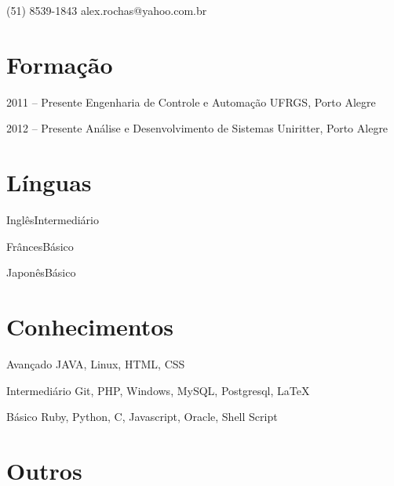 \documentclass{tccv}
\begin{document}
{(51) 8539-1843 }
{alex.rochas@yahoo.com.br}

\section{Formação}

\begin{yearlist}

\item{2011 -- Presente}
    {Engenharia de Controle e Automação}
    {UFRGS, Porto Alegre}

\item{2012 -- Presente}
    {Análise e Desenvolvimento de Sistemas}
    {Uniritter, Porto Alegre}

\end{yearlist}

\section{Línguas}

\begin{factlist}
\item{Inglês}{Intermediário}
\item{Frânces}{Básico}
\item{Japonês}{Básico}
\end{factlist}

\section{Conhecimentos}

\begin{factlist}

\item{Avançado}
    {JAVA, Linux, HTML, CSS}

\item{Intermediário}
    {Git, PHP, Windows, MySQL, Postgresql, {\LaTeX}}

\item{Básico}
    {Ruby, Python, C, Javascript, Oracle, Shell Script}

\end{factlist}

\section{Outros}
\end{document}

